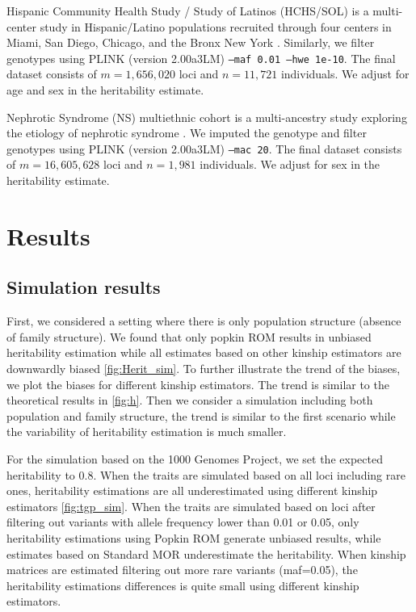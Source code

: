 \documentclass[11pt]{article}
\begin{document}
Hispanic Community Health Study / Study of Latinos (HCHS/SOL) is a multi-center study in Hispanic/Latino populations recruited through four centers in Miami, San Diego, Chicago, and the Bronx New York \citep{sorlie2010design}. Similarly, we filter genotypes using PLINK (version 2.00a3LM) \texttt{--maf 0.01 --hwe 1e-10}. The final dataset consists of $m=1,656,020 $ loci and $n=11,721 $ individuals. We adjust for age and sex in the heritability estimate.

Nephrotic Syndrome (NS) multiethnic cohort is a multi-ancestry study exploring the etiology of nephrotic syndrome \citep{cason2023genetic}. We imputed the genotype and filter genotypes using PLINK (version 2.00a3LM) \texttt{--mac 20}. The final dataset consists of $m=16,605,628  $ loci and $n=1,981  $ individuals. We adjust for sex in the heritability estimate.

\section{Results}

\subsection{Simulation results}

First, we considered a setting where there is only population structure (absence of family structure). We found that only popkin ROM results in unbiased heritability estimation while all estimates based on other kinship estimators are downwardly biased \cref{fig:Herit_sim}. To further illustrate the trend of the biases, we plot the biases for different kinship estimators. The trend is similar to the theoretical results in \cref{fig:h}. Then we consider a simulation including both population and family structure, the trend is similar to the first scenario while the variability of heritability estimation is much smaller.

For the simulation based on the 1000 Genomes Project, we set the expected heritability to 0.8. When the traits are simulated based on all loci including rare ones, heritability estimations are all underestimated using different kinship estimators \cref{fig:tgp_sim}. When the traits are simulated based on loci after filtering out variants with allele frequency lower than 0.01 or 0.05, only heritability estimations using Popkin ROM generate unbiased results, while estimates based on Standard MOR underestimate the heritability. When kinship matrices are estimated filtering out more rare variants (maf=0.05), the heritability estimations differences is quite small using different kinship estimators.
\end{document}
